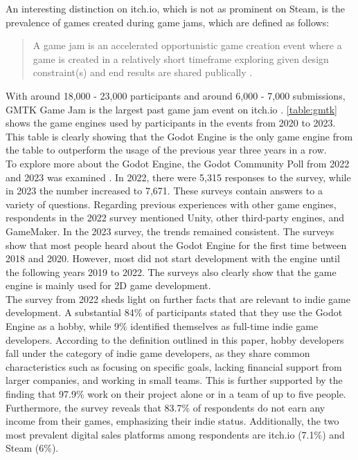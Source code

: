 An interesting distinction on itch.io, which is not as prominent on Steam, is the prevalence of games created during game jams, which are defined as follows:
\blockquote{A game jam is an accelerated opportunistic game creation event where a game is created in a relatively short timeframe exploring given design constraint(s) and end results are shared publically \cite{game-jam-definition}.}
With around 18,000 - 23,000 participants and around 6,000 - 7,000 submissions, GMTK Game Jam is the largest past game jam event on itch.io \cite{gmtk-game-jam-2021, gmtk-game-jam-2022, gmtk-game-jam-2023}.
\autoref{table:gmtk} shows the game engines used by participants in the events from 2020 to 2023.
This table is clearly showing that the Godot Engine is the only game engine from the table to outperform the usage of the previous year three years in a row. \\

To explore more about the Godot Engine, the Godot Community Poll from 2022 and 2023 was examined \cite{godot-poll-results-22,godot-poll-results-23}.
In 2022, there were 5,315 responses to the survey, while in 2023 the number increased to 7,671.
These surveys contain answers to a variety of questions.
Regarding previous experiences with other game engines, respondents in the 2022 survey mentioned Unity, other third-party engines, and GameMaker.
In the 2023 survey, the trends remained consistent.
The surveys show that most people heard about the Godot Engine for the first time between 2018 and 2020.
However, most did not start development with the engine until the following years 2019 to 2022.
The surveys also clearly show that the game engine is mainly used for 2D game development.\\

The survey from 2022 sheds light on further facts that are relevant to indie game development.
A substantial 84\% of participants stated that they use the Godot Engine as a hobby, while 9\% identified themselves as full-time indie game developers.
According to the definition outlined in this paper, hobby developers fall under the category of indie game developers, as they share common characteristics such as focusing on specific goals, lacking financial support from larger companies, and working in small teams.
This is further supported by the finding that 97.9\% work on their project alone or in a team of up to five people.
Furthermore, the survey reveals that 83.7\% of respondents do not earn any income from their games, emphasizing their indie status.
Additionally, the two most prevalent digital sales platforms among respondents are itch.io (7.1\%) and Steam (6\%). \\
